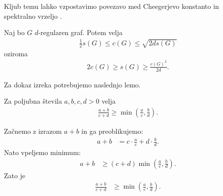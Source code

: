 Kljub temu lahko vzpostavimo povezavo med Cheegerjevo konstanto in spektralno vrzeljo \cite{chung-cheeger}.
\begin{izrek}\label{cheeger-neenakost}
    Naj bo \(G\) \(d\)-regularen graf. Potem velja 
    \begin{align*}
        \frac{1}{2}s(G) \leq c(G) \leq \sqrt{2ds(G)}
    \end{align*}
    oziroma
    \begin{align*}
        2c(G) \geq s(G) \geq \frac{c(G)^2}{2d}.
    \end{align*} 
\end{izrek}
Za dokaz izreka potrebujemo naslednjo lemo.
\begin{lema}\label{cheegerLema}
    Za poljubna števila \(a, b, c, d > 0\) velja
    \begin{align*}
        \frac{a+b}{c+d} \geq \min\left(\frac{a}{c}, \frac{b}{d}\right).
    \end{align*}
\end{lema}
\begin{dokaz}
    Začnemo z izrazom \(a+b\) in ga preoblikujemo:
    \begin{align*}
        a+b &= c\cdot\frac{a}{c} + d\cdot \frac{b}{d}.
    \end{align*}
    Nato vpeljemo minimum:
    \begin{align*}
        a+b &\geq (c+d) \min\left(\frac{a}{c}, \frac{b}{d}\right).
    \end{align*}
    Zato je 
    \begin{align*}
        \frac{a+b}{c+d} &\geq \min\left(\frac{a}{c}, \frac{b}{d}\right).
    \end{align*}
\end{dokaz}
